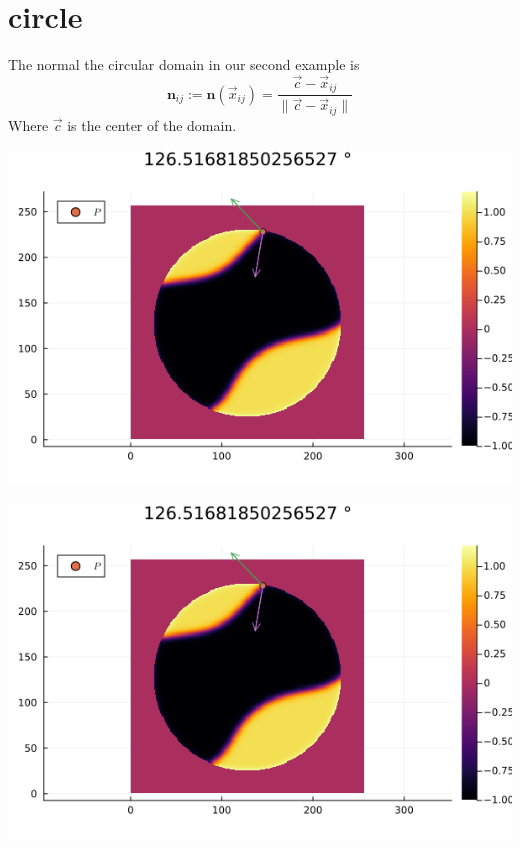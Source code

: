 \documentclass{mimosis}
\begin{document}
\section{circle}
\label{sec:org5293a77}
The normal the circular domain in our second example is
\begin{equation}
\label{eq:3}
\mathbf{n}_{ij} := \mathbf{n}(\vec{x}_{ij}) = \frac{\vec{c} - \vec{x}_{ij}}{\| \vec{c} - \vec{x}_{ij}\|}
\end{equation}
Where \(\vec{c}\) is the center of the domain.
\begin{center}
\includegraphics[width=.9\linewidth]{images/angle.png}
\label{angle-on-circle}
\end{center}

\begin{center}
\includegraphics[width=.9\linewidth]{images/angle.png}
\label{angle-evaluation}
\end{center}
\end{document}
